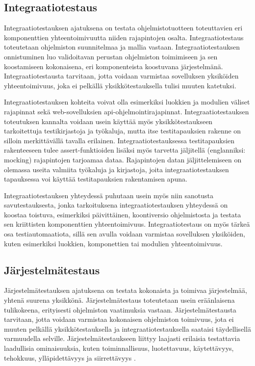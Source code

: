   \subsection{Integraatiotestaus} \label{ch:07_integraatiotestaus}

    Integraatiotestauksen ajatuksena on testata ohjelmistotuotteen toteuttavien eri komponenttien yhteentoimivuutta niiden rajapintojen osalta.
    Integraatiotestaus toteutetaan ohjelmiston suunnitelmaa ja mallia vastaan.
    Integraatiotestauksen onnistuminen luo validoitavan perustan ohjelmiston toimimiseen ja sen koostamiseen kokonaisena, eri komponenteista koostuvana järjestelmänä.
    Integraatiotestausta tarvitaan, jotta voidaan varmistaa sovelluksen yksiköiden yhteentoimivuus, joka ei pelkällä yksikkötestauksella tulisi muuten katetuksi.

    Integraatiotestauksen kohteita voivat olla esimerkiksi luokkien ja modulien väliset rajapinnat sekä web-sovelluksien api-ohjelmointirajapinnat.
    Integraatiotestauksen toteutuksen kannalta voidaan usein käyttää myös yksikkötestaukseen tarkoitettuja testikirjastoja ja työkaluja, mutta itse testitapauksien rakenne on silloin merkittävällä tavalla erilainen.
    Integraatiotestauksessa testitapauksien rakenteeseen tulee assert-funktioiden lisäksi myös tarvetta jäljitellä (englanniksi: mocking) rajapintojen tarjoamaa dataa.
    Rajapintojen datan jäljittelemiseen on olemassa useita valmiita työkaluja ja kirjastoja, joita integraatiotestauksen tapauksessa voi käyttää testitapauksien rakentamisen apuna.

    Integraatiotestauksen yhteydessä puhutaan usein myös niin sanotusta savutestauksesta, jonka tarkoituksena integraatiotestauksen yhteydessä on koostaa toistuva, esimerkiksi päivittäinen, koontiversio ohjelmistosta ja testata sen kriittisten komponenttien yhteentoimivuus.
    Integraatiotestaus on myös tärkeä osa testiautomaatiota, sillä sen avulla voidaan varmistaa sovelluksen yksiköiden, kuten esimerkiksi luokkien, komponettien tai modulien yhteentoimivuus.

  \subsection{Järjestelmätestaus} \label{ch:07_jarjestelmatestaus}

    Järjestelmätestauksen ajatuksena on testata kokonaista ja toimivaa järjestelmää, yhtenä suurena yksikkönä.
    Järjestelmätestaus toteutetaan usein eräänlaisena tulikokeena, erityisesti ohjelmiston vaatimuksia vastaan.
    Järjestelmätestausta tarvitaan, jotta voidaan varmistaa kokonaisen ohjelmiston toimivuus, jota ei muuten pelkällä yksikkötestauksella ja integraatiotestauksella saataisi täydellisellä varmuudella selville.
    Järjestelmätestaukseen liittyy laajasti erilaisia testattavia laadullisia ominaisuuksia, kuten toiminnallisuus, luotettavuus, käytettävyys, tehokkuus, ylläpidettävyys ja siirrettävyys \parencite{iso_9126-1_2001}.


